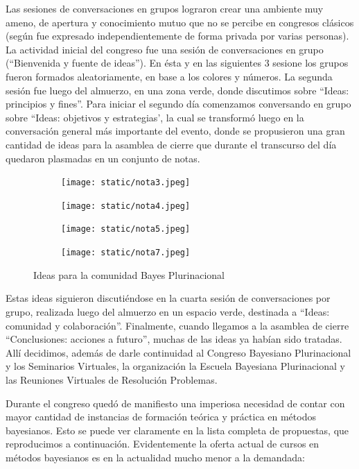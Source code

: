 \documentclass[a4paper,11pt]{book}
\theoremstyle{definition}
\begin{document}
Las sesiones de conversaciones en grupos lograron crear una ambiente muy ameno, de apertura y conocimiento mutuo que no se percibe en congresos clásicos (según fue expresado independientemente de forma privada por varias personas).
%
La actividad inicial del congreso fue una sesión de conversaciones en grupo (``Bienvenida y fuente de ideas'').
%
En ésta y en las siguientes 3 sesione los grupos fueron formados aleatoriamente, en base a los colores y números.
%
La segunda sesión fue luego del almuerzo, en una zona verde, donde discutimos sobre ``Ideas: principios y fines''.
%
Para iniciar el segundo día comenzamos conversando en grupo sobre ``Ideas: objetivos y estrategias', la cual se transformó luego en  la conversación general más importante del evento, donde se propusieron una gran cantidad de ideas para la asamblea de cierre que durante el transcurso del día quedaron plasmadas en un conjunto de notas.
%
\begin{figure}[!ht]
\centering
  \begin{subfigure}[b]{0.25\textwidth}
  \texttt{[image: static/nota3.jpeg]}
  \end{subfigure}
   \begin{subfigure}[b]{0.25\textwidth}
  \texttt{[image: static/nota4.jpeg]}
  \end{subfigure}
  \begin{subfigure}[b]{0.23\textwidth}
  \texttt{[image: static/nota5.jpeg]}
  \end{subfigure}
  \begin{subfigure}[b]{0.24\textwidth}
  \texttt{[image: static/nota7.jpeg]}
  \end{subfigure}
  \caption{Ideas para la comunidad Bayes Plurinacional}
\end{figure}
%
Estas ideas siguieron discutiéndose en la cuarta sesión de conversaciones por grupo, realizada luego del almuerzo en un espacio verde, destinada a ``Ideas: comunidad y colaboración''.
%
Finalmente, cuando llegamos a la asamblea de cierre ``Conclusiones: acciones a futuro'', muchas de las ideas ya habían sido tratadas.
%
Allí decidimos, además de darle continuidad al Congreso Bayesiano Plurinacional y los Seminarios Virtuales, la organización la Escuela Bayesiana Plurinacional y las Reuniones Virtuales de Resolución Problemas.


Durante el congreso quedó de manifiesto una imperiosa necesidad de contar con mayor cantidad de instancias de formación teórica y práctica en métodos bayesianos.
%
Esto se puede ver claramente en la lista completa de propuestas, que reproducimos a continuación.
%
Evidentemente la oferta actual de cursos en métodos bayesianos es en la actualidad mucho menor a la demandada:
\end{document}
